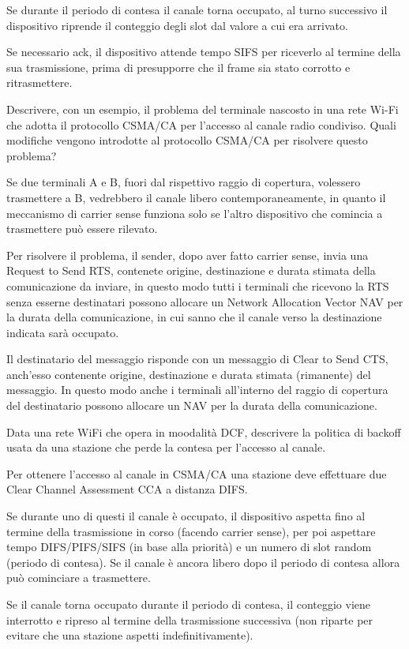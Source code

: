 \begin{questions}
\begin{solution}
        Se durante il periodo di contesa il canale torna occupato, al turno successivo il dispositivo riprende il conteggio degli slot dal valore a cui era arrivato.
        
        Se necessario ack, il dispositivo attende tempo SIFS per riceverlo al termine della sua trasmissione, prima di presupporre che il frame sia stato corrotto e ritrasmettere.
    \end{solution}
    
    \question Descrivere, con un esempio, il problema del terminale nascosto in una rete Wi-Fi che adotta il protocollo CSMA/CA per l'accesso al canale radio condiviso. Quali modifiche vengono introdotte al protocollo CSMA/CA per risolvere questo problema? 
    
    \begin{solution}
        Se due terminali A e B, fuori dal rispettivo raggio di copertura, volessero trasmettere a B, vedrebbero il canale libero contemporaneamente, in quanto il meccanismo di carrier sense funziona solo se l'altro dispositivo che comincia a trasmettere può essere rilevato.
        
        Per risolvere il problema, il sender, dopo aver fatto carrier sense, invia una Request to Send RTS, contenete origine, destinazione e durata stimata della comunicazione da inviare, in questo modo tutti i terminali che ricevono la RTS senza esserne destinatari possono allocare un Network Allocation Vector NAV per la durata della comunicazione, in cui sanno che il canale verso la destinazione indicata sarà occupato.
        
        Il destinatario del messaggio risponde con un messaggio di Clear to Send CTS, anch'esso contenente origine, destinazione e durata stimata (rimanente) del messaggio. In questo modo anche i terminali all'interno del raggio di copertura del destinatario possono allocare un NAV per la durata della comunicazione.
    \end{solution}
    
    \question Data una rete WiFi che opera in moodalità DCF, descrivere la politica di backoff usata da una stazione che perde la contesa per l'accesso al canale.
    
    \begin{solution}
        Per ottenere l'accesso al canale in CSMA/CA una stazione deve effettuare due Clear Channel Assessment CCA a distanza DIFS. 
        
        Se durante uno di questi il canale è occupato, il dispositivo aspetta fino al termine della trasmissione in corso (facendo carrier sense), per poi aspettare tempo DIFS/PIFS/SIFS (in base alla priorità) e un numero di slot random (periodo di contesa). Se il canale è ancora libero dopo il periodo di contesa allora può cominciare a trasmettere.
        
        Se il canale torna occupato durante il periodo di contesa, il conteggio viene interrotto e ripreso al termine della trasmissione successiva (non riparte per evitare che una stazione aspetti indefinitivamente).
    \end{solution}
\end{questions}